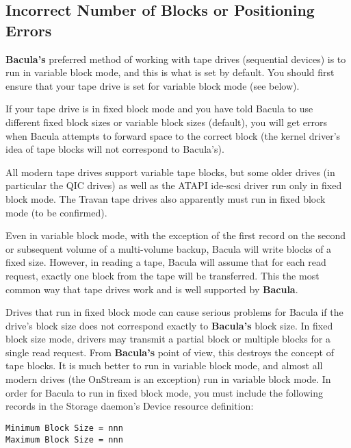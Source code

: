 \label{IncorrectBlocks}
\subsection{Incorrect Number of Blocks or Positioning Errors}

{\bf Bacula's} preferred method of working with tape drives (sequential
devices) is to run in variable block mode, and this is what is set by default.
You should first ensure that your tape drive is set for variable block mode
(see below). 

If your tape drive is in fixed block mode and you have told Bacula to use
different fixed block sizes or variable block sizes (default), you will get
errors when Bacula attempts to forward space to the correct block (the kernel
driver's idea of tape blocks will not correspond to Bacula's). 

All modern tape drives support variable tape blocks, but some older drives (in
particular the QIC drives) as well as the ATAPI ide-scsi driver run only in
fixed block mode. The Travan tape drives also apparently must run in fixed
block mode (to be confirmed). 

Even in variable block mode, with the exception of the first record on the
second or subsequent volume of a multi-volume backup, Bacula will write blocks
of a fixed size. However, in reading a tape, Bacula will assume that for each
read request, exactly one block from the tape will be transferred. This the
most common way that tape drives work and is well supported by {\bf Bacula}. 

Drives that run in fixed block mode can cause serious problems for Bacula if
the drive's block size does not correspond exactly to {\bf Bacula's} block
size. In fixed block size mode, drivers may transmit a partial block or
multiple blocks for a single read request. From {\bf Bacula's} point of view,
this destroys the concept of tape blocks. It is much better to run in variable
block mode, and almost all modern drives (the OnStream is an exception) run in
variable block mode. In order for Bacula to run in fixed block mode, you must
include the following records in the Storage daemon's Device resource
definition: 

\footnotesize
\begin{verbatim}
Minimum Block Size = nnn
Maximum Block Size = nnn
\end{verbatim}
\normalsize

